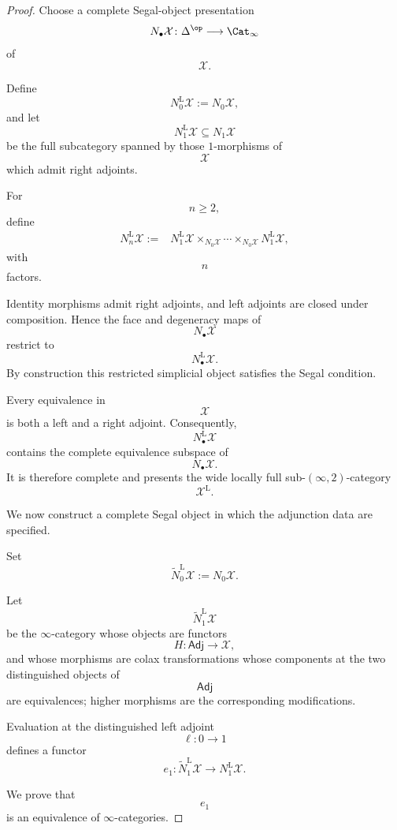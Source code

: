 \begin{proof}
Choose a complete Segal-object presentation
\[
    N_\bullet\mathcal X
    \colon
    \Delta^{\op}
    \longrightarrow
    \Cat_\infty
\]
of
\[
    \mathcal X.
\]

Define
\[
    N_0^{\mathrm L}\mathcal X
    :=
    N_0\mathcal X,
\]
and let
\[
    N_1^{\mathrm L}\mathcal X
    \subseteq
    N_1\mathcal X
\]
be the full subcategory spanned by those $1$-morphisms of
\[
    \mathcal X
\]
which admit right adjoints.

For
\[
    n\geq 2,
\]
define
\[
\begin{aligned}
    N_n^{\mathrm L}\mathcal X
    :={}&
    N_1^{\mathrm L}\mathcal X
    \times_{N_0\mathcal X}
    \cdots
    \times_{N_0\mathcal X}
    N_1^{\mathrm L}\mathcal X,
\end{aligned}
\]
with
\[
    n
\]
factors.

Identity morphisms admit right adjoints, and left adjoints are closed
under composition. Hence the face and degeneracy maps of
\[
    N_\bullet\mathcal X
\]
restrict to
\[
    N_\bullet^{\mathrm L}\mathcal X.
\]
By construction this restricted simplicial object satisfies the Segal
condition.

Every equivalence in
\[
    \mathcal X
\]
is both a left and a right adjoint. Consequently,
\[
    N_\bullet^{\mathrm L}\mathcal X
\]
contains the complete equivalence subspace of
\[
    N_\bullet\mathcal X.
\]
It is therefore complete and presents the wide locally full
sub-$(\infty,2)$-category
\[
    \mathcal X^{\mathrm L}.
\]

We now construct a complete Segal object in which the adjunction data are
specified.

Set
\[
    \widetilde N_0^{\mathrm L}\mathcal X
    :=
    N_0\mathcal X.
\]

Let
\[
    \widetilde N_1^{\mathrm L}\mathcal X
\]
be the $\infty$-category whose objects are functors
\[
    H
    \colon
    \mathsf{Adj}
    \longrightarrow
    \mathcal X,
\]
and whose morphisms are colax transformations whose components at the
two distinguished objects of
\[
    \mathsf{Adj}
\]
are equivalences; higher morphisms are the corresponding modifications.

Evaluation at the distinguished left adjoint
\[
    \ell
    \colon
    0
    \longrightarrow
    1
\]
defines a functor
\[
    e_1
    \colon
    \widetilde N_1^{\mathrm L}\mathcal X
    \longrightarrow
    N_1^{\mathrm L}\mathcal X.
\]

We prove that
\[
    e_1
\]
is an equivalence of $\infty$-categories.


\end{proof}
